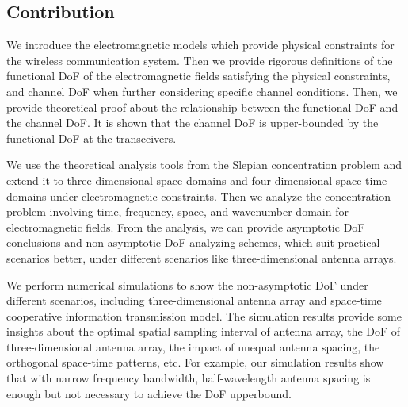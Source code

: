 \documentclass[12pt,draftclsnofoot,journal,onecolumn]{IEEEtran}
\begin{document}
\subsection{Contribution}
\begin{itemize}
	{\color{red}
	\item{We introduce the electromagnetic models which provide physical constraints for the wireless communication system. Then we provide rigorous definitions of the functional DoF of the electromagnetic fields satisfying the physical constraints, and channel DoF when further considering specific channel conditions. Then, we provide theoretical proof about the relationship between the functional DoF and the channel DoF. It is shown that the channel DoF is upper-bounded by the functional DoF at the transceivers.}
	\item{We use the theoretical analysis tools from the Slepian concentration problem and extend it to three-dimensional space domains and four-dimensional space-time domains under electromagnetic constraints. Then we analyze the concentration problem involving time, frequency, space, and wavenumber domain for electromagnetic fields. From the analysis, we can provide asymptotic DoF conclusions and non-asymptotic DoF analyzing schemes, which suit practical scenarios better, under different scenarios like three-dimensional antenna arrays. } 
	}
	\item{We perform numerical simulations to show the non-asymptotic DoF under different scenarios, including three-dimensional antenna array and space-time cooperative information transmission model. The simulation results provide some insights about the optimal spatial sampling interval of antenna array, the DoF of three-dimensional antenna array, the impact of unequal antenna spacing, the orthogonal space-time patterns, etc. For example, our simulation results show that with narrow frequency bandwidth, half-wavelength antenna spacing is enough but not necessary to achieve the DoF upperbound.}	
\end{itemize}
\end{document}
